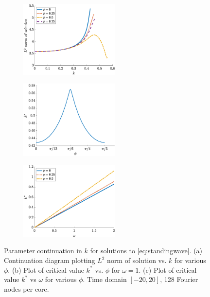 \documentclass[11pt,reqno]{amsart}
\begin{document}
\begin{figure}
    \centering
    \begin{subfigure}{0.3\linewidth}
        \caption{}
        \label{fig:kcont2q}
        \includegraphics[width=5cm]{contkL2norm.eps}
    \end{subfigure}
    \begin{subfigure}{0.3\linewidth}
        \caption{}
        \label{fig:kcont2b}
        \includegraphics[width=5cm]{contkstarvsphi.eps}
    \end{subfigure}
    \begin{subfigure}{0.3\linewidth}
        \caption{}
        \label{fig:kcont2c}
        \includegraphics[width=5cm]{contkstarvsomega.eps}
    \end{subfigure}
    \caption{Parameter continuation in $k$ for solutions to \cref{eq:standingwave}. (a) Continuation diagram plotting $L^2$ norm of solution vs. $k$ for various $\phi$. (b) Plot of critical value $k^*$ vs. $\phi$ for $\omega = 1$. (c) Plot of critical value $k^*$ vs $\omega$ for various $\phi$. Time domain $[-20,20]$, 128 Fourier nodes per core.}
    \label{fig:kcont2}
\end{figure}
\end{document}

